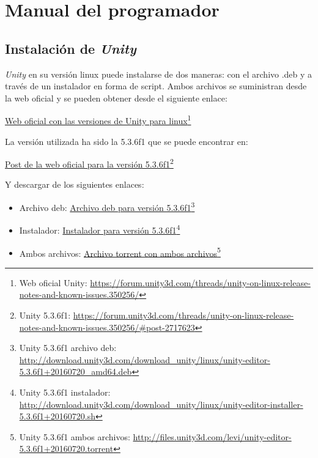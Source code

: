 \section{Manual del programador}
\subsection{Instalación de \textit{Unity}}

\textit{Unity} \cite{unityweb} en su versión linux puede instalarse de dos maneras: con el archivo .deb y a través de un instalador en forma de script. Ambos archivos se suministran desde la web oficial y se pueden obtener desde el siguiente enlace:

\href{https://forum.unity3d.com/threads/unity-on-linux-release-notes-and-known-issues.350256/}{Web oficial con las versiones de Unity para linux}\footnote{Web oficial Unity: \url{https://forum.unity3d.com/threads/unity-on-linux-release-notes-and-known-issues.350256/}}

La versión utilizada ha sido la 5.3.6f1 que se puede encontrar en:

\href{https://forum.unity3d.com/threads/unity-on-linux-release-notes-and-known-issues.350256/#post-2717623}{Post de la web oficial para la versión 5.3.6f1}\footnote{Unity 5.3.6f1: \url{https://forum.unity3d.com/threads/unity-on-linux-release-notes-and-known-issues.350256/\#post-2717623}}

Y descargar de los siguientes enlaces:

\begin{itemize}
\item Archivo deb: \href{http://download.unity3d.com/download_unity/linux/unity-editor-5.3.6f1+20160720_amd64.deb}{Archivo deb para versión 5.3.6f1}\footnote{Unity 5.3.6f1 archivo deb: \url{http://download.unity3d.com/download_unity/linux/unity-editor-5.3.6f1+20160720_amd64.deb}}

\item Instalador: \href{http://download.unity3d.com/download_unity/linux/unity-editor-installer-5.3.6f1+20160720.sh}{Instalador para versión 5.3.6f1}\footnote{Unity 5.3.6f1 instalador: \url{http://download.unity3d.com/download_unity/linux/unity-editor-installer-5.3.6f1+20160720.sh}}

\item Ambos archivos: \href{http://files.unity3d.com/levi/unity-editor-5.3.6f1+20160720.torrent}{Archivo torrent con ambos archivos}\footnote{Unity 5.3.6f1 ambos archivos: \url{http://files.unity3d.com/levi/unity-editor-5.3.6f1+20160720.torrent}}
\end{itemize}

